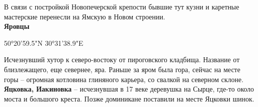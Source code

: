 В связи с постройкой Новопечерской крепости бывшие тут кузни и каретные мастерские перенесли на Ямскую в Новом строении.\\


\textbf{Яровцы} 

50°20'59.5"N 30°31'38.9"E

Исчезнувший хутор к северо-востоку от пироговского кладбища. Название от близлежащего, еще севернее, яра. Раньше за яром была гора, сейчас на месте горы – огромная котловина глиняного карьера, со свалкой на северном склоне.\\

\textbf{Яцковка, Иакиновка} – исчезнувшая в 17 веке деревушка на Сырце, где-то около моста и большого креста. Позже доминикане поставили на месте Яцковки шинок.